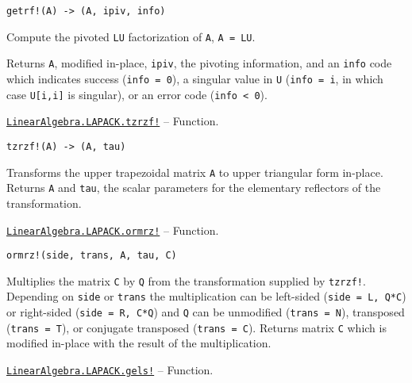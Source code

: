 \begin{adjustwidth}{2em}{0pt}


\begin{verbatim}
getrf!(A) -> (A, ipiv, info)
\end{verbatim}

Compute the pivoted \texttt{LU} factorization of \texttt{A}, \texttt{A = LU}.

Returns \texttt{A}, modified in-place, \texttt{ipiv}, the pivoting information, and an \texttt{info} code which indicates success (\texttt{info = 0}), a singular value in \texttt{U} (\texttt{info = i}, in which case \texttt{U[i,i]} is singular), or an error code (\texttt{info < 0}).



\end{adjustwidth}
\hypertarget{8099284094733410089}{}
\hyperlink{8099284094733410089}{\texttt{LinearAlgebra.LAPACK.tzrzf!}}  -- {Function.}

\begin{adjustwidth}{2em}{0pt}


\begin{verbatim}
tzrzf!(A) -> (A, tau)
\end{verbatim}

Transforms the upper trapezoidal matrix \texttt{A} to upper triangular form in-place. Returns \texttt{A} and \texttt{tau}, the scalar parameters for the elementary reflectors of the transformation.



\end{adjustwidth}
\hypertarget{15550486828362807519}{}
\hyperlink{15550486828362807519}{\texttt{LinearAlgebra.LAPACK.ormrz!}}  -- {Function.}

\begin{adjustwidth}{2em}{0pt}


\begin{verbatim}
ormrz!(side, trans, A, tau, C)
\end{verbatim}

Multiplies the matrix \texttt{C} by \texttt{Q} from the transformation supplied by \texttt{tzrzf!}. Depending on \texttt{side} or \texttt{trans} the multiplication can be left-sided (\texttt{side = L, Q*C}) or right-sided (\texttt{side = R, C*Q}) and \texttt{Q} can be unmodified (\texttt{trans = N}), transposed (\texttt{trans = T}), or conjugate transposed (\texttt{trans = C}). Returns matrix \texttt{C} which is modified in-place with the result of the multiplication.



\end{adjustwidth}
\hypertarget{18299455515085793306}{}
\hyperlink{18299455515085793306}{\texttt{LinearAlgebra.LAPACK.gels!}}  -- {Function.}

